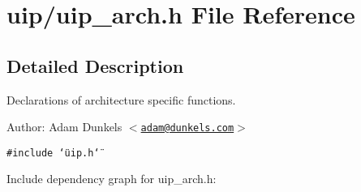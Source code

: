 \hypertarget{a00055}{
\section{uip/uip\_\-arch.h File Reference}
\label{a00055}
}


\subsection{Detailed Description}
Declarations of architecture specific functions. 

\begin{Desc}
\item[Author:]Adam Dunkels $<$\href{mailto:adam@dunkels.com}{\tt adam@dunkels.com}$>$ \end{Desc}


{\tt \#include \char`\"{}uip.h\char`\"{}}\par


Include dependency graph for uip\_\-arch.h:

